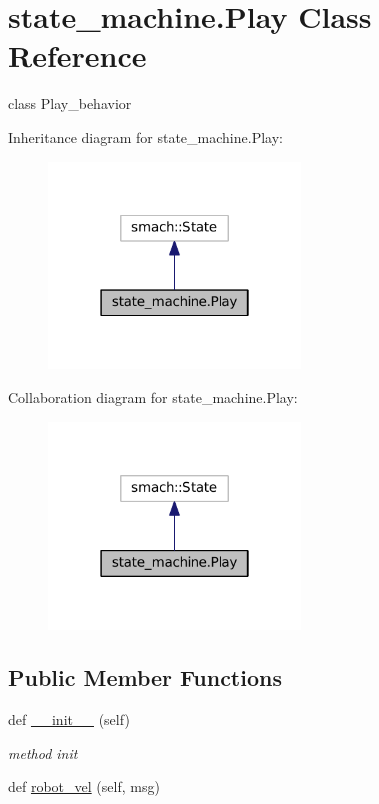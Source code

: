 \hypertarget{classstate__machine_1_1Play}{}\section{state\+\_\+machine.\+Play Class Reference}
\label{classstate__machine_1_1Play}


class Play\+\_\+behavior  




Inheritance diagram for state\+\_\+machine.\+Play\+:
\nopagebreak
\begin{figure}[H]
\begin{center}
\leavevmode
\includegraphics[width=190pt]{classstate__machine_1_1Play__inherit__graph}
\end{center}
\end{figure}


Collaboration diagram for state\+\_\+machine.\+Play\+:
\nopagebreak
\begin{figure}[H]
\begin{center}
\leavevmode
\includegraphics[width=190pt]{classstate__machine_1_1Play__coll__graph}
\end{center}
\end{figure}
\subsection*{Public Member Functions}
\begin{DoxyCompactItemize}
\item 
def \hyperlink{classstate__machine_1_1Play_a5993a23d8be7f7b2647f71ede0334957}{\+\_\+\+\_\+init\+\_\+\+\_\+} (self)
\begin{DoxyCompactList}\small\item\em method init \end{DoxyCompactList}\item 
def \hyperlink{classstate__machine_1_1Play_abf792c51f9931e669b0ed46ba0801986}{robot\+\_\+vel} (self, msg)
\end{DoxyCompactItemize}
